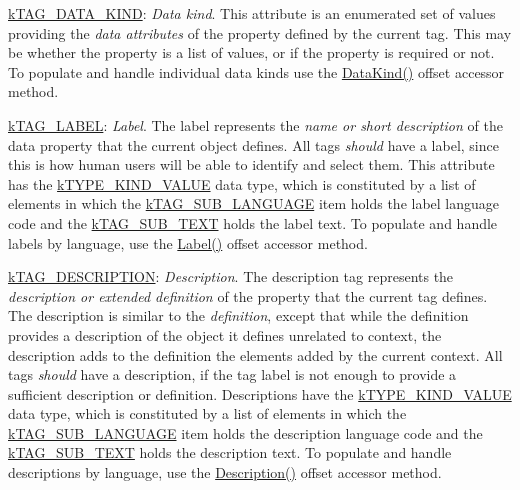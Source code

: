 \begin{DoxyItemize}
\item {\ttfamily \hyperlink{}{k\-T\-A\-G\-\_\-\-D\-A\-T\-A\-\_\-\-K\-I\-N\-D}}\-: {\itshape Data kind}. This attribute is an enumerated set of values providing the {\itshape data attributes} of the property defined by the current tag. This may be whether the property is a list of values, or if the property is required or not. To populate and handle individual data kinds use the \hyperlink{class_ontology_wrapper_1_1_tag_object_a4e45b95407e911cc4dfdce3c5384ee0c}{Data\-Kind()} offset accessor method. 
\item {\ttfamily \hyperlink{}{k\-T\-A\-G\-\_\-\-L\-A\-B\-E\-L}}\-: {\itshape Label}. The label represents the {\itshape name or short description} of the data property that the current object defines. All tags {\itshape should} have a label, since this is how human users will be able to identify and select them. This attribute has the \hyperlink{}{k\-T\-Y\-P\-E\-\_\-\-K\-I\-N\-D\-\_\-\-V\-A\-L\-U\-E} data type, which is constituted by a list of elements in which the \hyperlink{}{k\-T\-A\-G\-\_\-\-S\-U\-B\-\_\-\-L\-A\-N\-G\-U\-A\-G\-E} item holds the label language code and the \hyperlink{}{k\-T\-A\-G\-\_\-\-S\-U\-B\-\_\-\-T\-E\-X\-T} holds the label text. To populate and handle labels by language, use the \hyperlink{class_ontology_wrapper_1_1_tag_object_aff2f456246175999477d30308ba46f5d}{Label()} offset accessor method. 
\item {\ttfamily \hyperlink{}{k\-T\-A\-G\-\_\-\-D\-E\-S\-C\-R\-I\-P\-T\-I\-O\-N}}\-: {\itshape Description}. The description tag represents the {\itshape description or extended definition} of the property that the current tag defines. The description is similar to the {\itshape definition}, except that while the definition provides a description of the object it defines unrelated to context, the description adds to the definition the elements added by the current context. All tags {\itshape should} have a description, if the tag label is not enough to provide a sufficient description or definition. Descriptions have the \hyperlink{}{k\-T\-Y\-P\-E\-\_\-\-K\-I\-N\-D\-\_\-\-V\-A\-L\-U\-E} data type, which is constituted by a list of elements in which the \hyperlink{}{k\-T\-A\-G\-\_\-\-S\-U\-B\-\_\-\-L\-A\-N\-G\-U\-A\-G\-E} item holds the description language code and the \hyperlink{}{k\-T\-A\-G\-\_\-\-S\-U\-B\-\_\-\-T\-E\-X\-T} holds the description text. To populate and handle descriptions by language, use the \hyperlink{class_ontology_wrapper_1_1_tag_object_a3af9d817a489a0adfa3bbaf6b1a3484a}{Description()} offset accessor method. 
\end{DoxyItemize}

